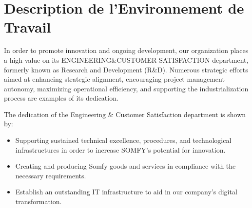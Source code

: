 \section{Description de l'Environnement de Travail}

In order to promote innovation and ongoing development, our organization places a high value on its ENGINEERING{\&}CUSTOMER SATISFACTION department, formerly known as Research and Development (R{\&}D). Numerous strategic efforts aimed at enhancing strategic alignment, encouraging project management autonomy, maximizing operational efficiency, and supporting the industrialization process are examples of its dedication.

The dedication of the Engineering & Customer Satisfaction department is shown by:
\begin{itemize}[label=\textbullet, font=\LARGE]
    \item Supporting sustained technical excellence, procedures, and technological infrastructures in order to increase SOMFY's potential for innovation.
    \item Creating and producing Somfy goods and services in compliance with the necessary requirements.
    \item Establish an outstanding IT infrastructure to aid in our company's digital transformation.
\end{itemize}


